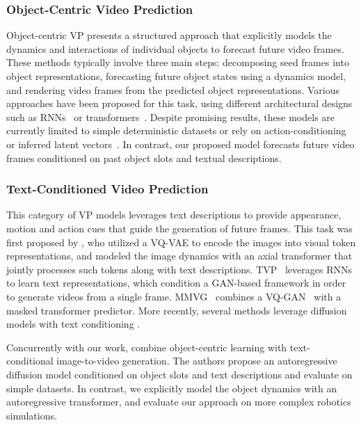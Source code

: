 \subsubsection{Object-Centric Video Prediction}

Object-centric VP presents a structured approach that explicitly models the dynamics and interactions of individual objects to forecast future video frames.
%
These methods typically involve three main steps: decomposing seed frames into object representations, forecasting future object states using a dynamics model, and rendering video frames from the predicted object representations.
%
Various approaches have been proposed for this task, using different architectural designs such as
RNNs~\cite{creswell2021unsupervised, Zoran_PARTS_2021, Nguyen_ReusableSlotwiseMechanisms_2024} or transformers~\cite{wu2021generative, Wu_SlotFormer_2022, villar2023object, Song_ObjectMotionAppearanceDynamics_2023, Daniel_DDLP_2024}.
%
Despite promising results, these models are currently limited to simple deterministic datasets or rely on action-conditioning~\cite{Mosbach_SOLDReinforcementLearningSlotObjectCentricLatentDynamics} or inferred latent vectors~\cite{playslot}.
%
In contrast, our proposed model forecasts future video frames conditioned on past object slots and textual descriptions.



\subsubsection{Text-Conditioned Video Prediction}
%
This category of VP models leverages text descriptions to provide appearance, motion and action cues that guide the generation of future frames.
%
This task was first proposed by \citet{hu2022make}, who utilized a VQ-VAE to encode the images into visual token representations, and modeled the image dynamics with an axial transformer that jointly processes such tokens along with text descriptions.
%
TVP~\cite{song2024text} leverages RNNs to learn text representations, which condition a GAN-based framework in order to generate videos from a single frame.
%
MMVG~\cite{fu2023tell} combines a VQ-GAN~\cite{esser2021taming} with a masked transformer predictor.
%
More recently, several methods leverage diffusion models with text conditioning \cite{gu2023seer,ni2023conditional,chen2023livephoto}.

Concurrently with our work, \citet{wang2024tiv} combine object-centric learning with text-conditional image-to-video generation.
%
The authors propose an autoregressive diffusion model conditioned on object slots and text descriptions and evaluate on simple datasets.
%
In contrast, we explicitly model the object dynamics with an autoregressive transformer, and evaluate our approach on more complex robotics simulations.